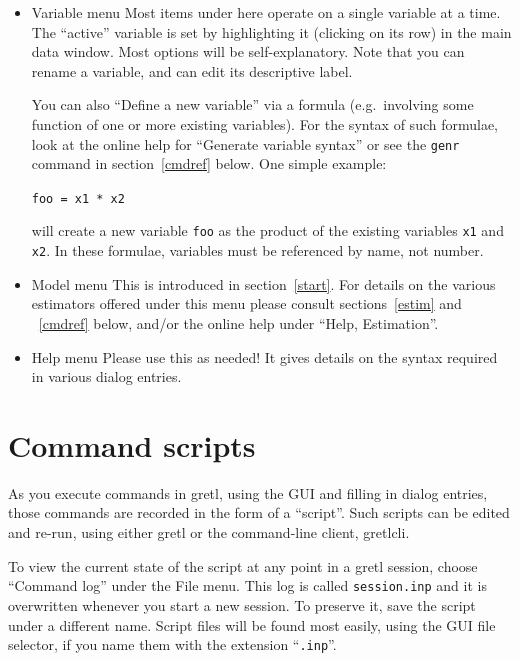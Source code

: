 \documentclass{article}
\begin{document}
\begin{itemize}
\item \textsf{Variable menu} Most items under here operate on a single
  variable at a time.  The ``active'' variable is set by highlighting
  it (clicking on its row) in the main data window.  Most options
  will be self-explanatory.  Note that you can rename a variable,
  and can edit its descriptive label.  
  
  You can also ``Define a new variable'' via a formula (e.g.\ 
  involving some function of one or more existing variables).  For the
  syntax of such formulae, look at the online help for ``Generate
  variable syntax'' or see the \texttt{genr} command in
  section~\ref{cmdref} below.  One simple example:
\begin{center}
\texttt{foo = x1 * x2} 
\end{center}
will create a new variable \texttt{foo} as the product of the existing
variables \texttt{x1} and \texttt{x2}.  In these formulae, variables
must be referenced by name, not number. 

\item \textsf{Model menu} This is introduced in section~\ref{start}.
  For details on the various estimators offered under this menu please
  consult sections~\ref{estim} and ~\ref{cmdref} below, and/or the
  online help under ``Help, Estimation''.

\item \textsf{Help menu}  Please use this as needed!  It gives details
  on the syntax required in various dialog entries.   

\end{itemize}

\section{Command scripts}
\label{scripts}

As you execute commands in \textsf{gretl}, using the GUI and filling
in dialog entries, those commands are recorded in the form of a
``script''.  Such scripts can be edited and re-run, using
either \textsf{gretl} or the command-line client, \textsf{gretlcli}.

To view the current state of the script at any point in a
\textsf{gretl} session, choose ``Command log'' under the File menu.
This log is called \texttt{session.inp} and it is overwritten whenever
you start a new session.  To preserve it, save the script under a
different name.  Script files will be found most easily, using the GUI
file selector, if you name them with the extension ``\texttt{.inp}''.
\end{document}
